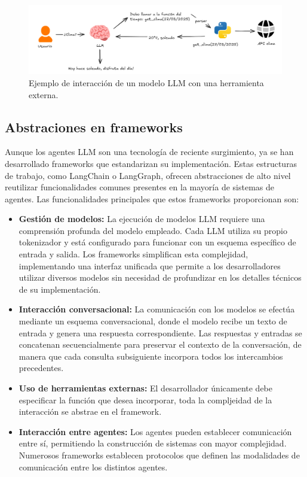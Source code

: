 \begin{figure}
  \centering
  \includegraphics[width=1\linewidth]{figures/herramienta.png}
  \caption{Ejemplo de interacción de un modelo LLM con una herramienta externa.}
  \label{fig:herramientas}
\end{figure}

\subsection{Abstraciones en frameworks}
Aunque los agentes LLM son una tecnología de reciente surgimiento, ya se han desarrollado frameworks que estandarizan su implementación. Estas estructuras de trabajo, como LangChain o LangGraph, ofrecen abstracciones de alto nivel reutilizar funcionalidades comunes presentes en la mayoría de sistemas de agentes.
Las funcionalidades principales que estos frameworks proporcionan son:
\begin{itemize}
\item {\textbf{Gestión de modelos:}} La ejecución de modelos LLM requiere una comprensión profunda del modelo empleado. Cada LLM utiliza su propio tokenizador y está configurado para funcionar con un esquema específico de entrada y salida. Los frameworks simplifican esta complejidad, implementando una interfaz unificada que permite a los desarrolladores utilizar diversos modelos sin necesidad de profundizar en los detalles técnicos de su implementación.
\item {\textbf{Interacción conversacional:}} La comunicación con los modelos se efectúa mediante un esquema conversacional, donde el modelo recibe un texto de entrada y genera una respuesta correspondiente. Las respuestas y entradas se concatenan secuencialmente para preservar el contexto de la conversación, de manera que cada consulta subsiguiente incorpora todos los intercambios precedentes.
  \item {\textbf{Uso de herramientas externas:}} El desarrollador únicamente debe especificar la función que desea incorporar, toda la compljeidad de la interacción se abstrae en el framework.
\item {\textbf{Interacción entre agentes:}} Los agentes pueden establecer comunicación entre sí, permitiendo la construcción de sistemas con mayor complejidad. Numerosos frameworks establecen protocolos que definen las modalidades de comunicación entre los distintos agentes.
\end{itemize}

